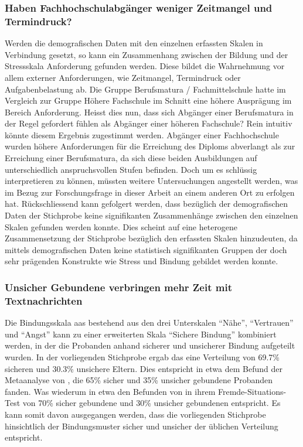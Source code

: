 \subsubsection{Haben Fachhochschulabgänger weniger Zeitmangel und Termindruck?}
Werden die demografischen Daten mit den einzelnen erfassten Skalen in Verbindung gesetzt, so kann ein Zusammenhang zwischen der Bildung und der Stressskala Anforderung gefunden werden. Diese bildet die Wahrnehmung vor allem externer Anforderungen, wie Zeitmangel, Termindruck oder Aufgabenbelastung ab. Die Gruppe Berufsmatura / Fachmittelschule hatte im Vergleich zur Gruppe Höhere Fachschule im Schnitt eine höhere Ausprägung im Bereich Anforderung. Heisst dies nun, dass sich Abgänger einer Berufsmatura in der Regel gefordert fühlen als Abgänger einer höheren Fachschule? Rein intuitiv könnte diesem Ergebnis zugestimmt werden. Abgänger einer Fachhochschule wurden  höhere Anforderungen für die Erreichung des Diploms abverlangt als zur Erreichung einer Berufsmatura, da sich diese beiden Ausbildungen auf unterschiedlich anspruchsvollen Stufen befinden. Doch um es schlüssig interpretieren zu können, müssten weitere Untersuchungen angestellt werden, was im Bezug zur Forschungsfrage in dieser Arbeit an einem anderen Ort zu erfolgen hat. Rückschliessend kann gefolgert werden, dass bezüglich der demografischen Daten der Stichprobe keine signifikanten Zusammenhänge zwischen den einzelnen Skalen gefunden werden konnte. Dies scheint auf eine heterogene Zusammensetzung der Stichprobe bezüglich den erfassten Skalen hinzudeuten, da mittels demografischen Daten keine statistisch signifikanten Gruppen der doch sehr prägenden Konstrukte wie Stress und Bindung gebildet werden konnte. 

\subsubsection{Unsicher Gebundene verbringen mehr Zeit mit Textnachrichten}
Die Bindungsskala \acrfull{aas} bestehend aus den drei Unterskalen \enquote{Nähe}, \enquote{Vertrauen} und \enquote{Angst} kann zu einer erweiterten Skala \enquote{Sichere Bindung} kombiniert werden, in der die Probanden anhand sicherer und unsicherer Bindung aufgeteilt wurden. In der vorliegenden Stichprobe ergab das eine Verteilung von 
69.7\% sicheren und 30.3\% unsichere Eltern. Dies entspricht in etwa dem Befund der Metaanalyse von , die 65\% sicher und 35\% unsicher gebundene Probanden fanden. Was wiederum in etwa den Befunden von  in ihrem Fremde-Situations-Test von 70\% sicher gebundene und 30\% unsicher gebundenen entspricht. Es kann somit davon ausgegangen werden, dass die vorliegenden Stichprobe hinsichtlich der Bindungsmuster sicher und unsicher der üblichen Verteilung entspricht.


